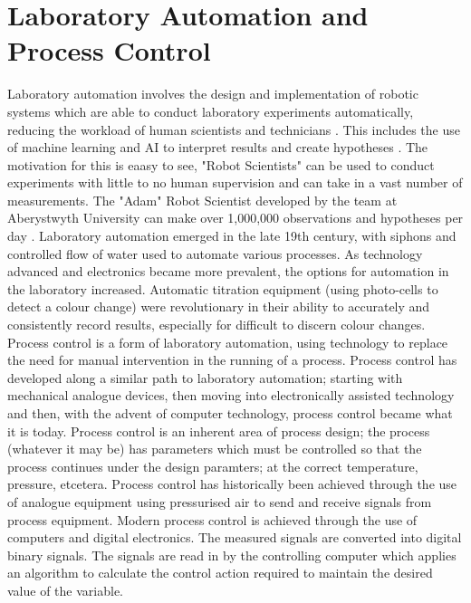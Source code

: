 \documentclass[a4]{report}
\def\br{\newline \newline \noindent}
\begin{document}
	\section{Laboratory Automation and Process Control}
	Laboratory automation involves the design and implementation of robotic systems which are able to conduct laboratory experiments automatically, reducing the workload of human scientists and technicians \cite{backwhatisauto}. This includes the use of machine learning and AI to interpret results and create hypotheses \cite{backlitrevai, backbaconauto, backlabauto}. The motivation for this is eaasy to see, "Robot Scientists" can be used to conduct experiments with little to no human supervision and can take in a vast number of measurements. The "Adam" Robot Scientist developed by the team at Aberystwyth University can make over 1,000,000 observations and hypotheses per day \cite{backontorobsci}. \newline \newline \noindent
	Laboratory automation emerged in the late 19th century, with siphons and controlled flow of water used to automate various processes. As technology advanced and electronics became more prevalent, the options for automation in the laboratory increased. Automatic titration equipment (using photo-cells to detect a colour change) were revolutionary in their ability to accurately and consistently record results, especially for difficult to discern colour changes. \br
	Process control is a form of laboratory automation, using technology to replace the need for manual intervention in the running of a process. Process control has developed along a similar path to laboratory automation; starting with mechanical analogue devices, then moving into electronically assisted technology and then, with the advent of computer technology, process control became what it is today.
	Process control is an inherent area of process design; the process (whatever it may be) has parameters which must be controlled so that the process continues under the design paramters; at the correct temperature, pressure, etcetera. Process control has historically been achieved through the use of analogue equipment using pressurised air to send and receive signals from process equipment. Modern process control is achieved through the use of computers and digital electronics. The measured signals are converted into digital binary signals. The signals are read in by the controlling computer which applies an algorithm to calculate the control action required to maintain the desired value of the variable. \newline \newline \noindent
\end{document}
